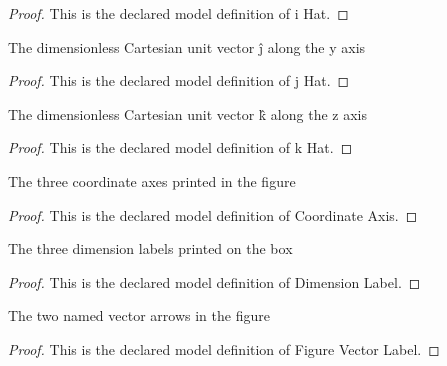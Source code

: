 \begin{proof}
  This is the declared model definition of i Hat.
\end{proof}
\begin{definition}[j Hat]
  \label{def:physics:phyx-mini-0682:phyxminiproblems-problemphyxmini0682-jhat}
  The dimensionless Cartesian unit vector ĵ along the y axis
\end{definition}
\begin{proof}
  This is the declared model definition of j Hat.
\end{proof}
\begin{definition}[k Hat]
  \label{def:physics:phyx-mini-0682:phyxminiproblems-problemphyxmini0682-khat}
  The dimensionless Cartesian unit vector k̂ along the z axis
\end{definition}
\begin{proof}
  This is the declared model definition of k Hat.
\end{proof}
\begin{definition}
  \label{def:physics:phyx-mini-0682:phyxminiproblems-problemphyxmini0682-coordinateaxis}
  The three coordinate axes printed in the figure
\end{definition}
\begin{proof}
  This is the declared model definition of Coordinate Axis.
\end{proof}
\begin{definition}
  \label{def:physics:phyx-mini-0682:phyxminiproblems-problemphyxmini0682-dimensionlabel}
  The three dimension labels printed on the box
\end{definition}
\begin{proof}
  This is the declared model definition of Dimension Label.
\end{proof}
\begin{definition}
  \label{def:physics:phyx-mini-0682:phyxminiproblems-problemphyxmini0682-figurevectorlabel}
  The two named vector arrows in the figure
\end{definition}
\begin{proof}
  This is the declared model definition of Figure Vector Label.
\end{proof}
